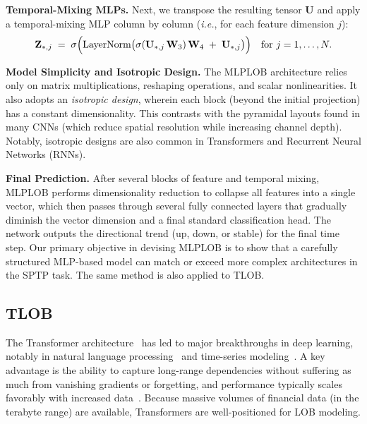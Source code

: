 \textbf{Temporal-Mixing MLPs.}
Next, we transpose the resulting tensor $\mathbf{U}$ and apply a temporal-mixing MLP column by column (\emph{i.e.}, for each feature dimension $j$):
\begin{equation}
    \mathbf{Z}_{*,j} \;=\; 
    \sigma\Bigl(
      \text{LayerNorm}\bigl(
          \sigma(\mathbf{U}_{*,j}\,\mathbf{W}_3)\,\mathbf{W}_4 
          \;+\; \mathbf{U}_{*,j}
      \bigr)
    \Bigr)
    \quad\text{for } j=1,\dots,N.
\end{equation}



\textbf{Model Simplicity and Isotropic Design.}
The MLPLOB architecture relies only on matrix multiplications, reshaping operations, and scalar nonlinearities. It also adopts an \emph{isotropic design}, wherein each block (beyond the initial projection) has a constant dimensionality. This contrasts with the pyramidal layouts found in many CNNs (which reduce spatial resolution while increasing channel depth). Notably, isotropic designs are also common in Transformers and Recurrent Neural Networks (RNNs).

\textbf{Final Prediction.}
After several blocks of feature and temporal mixing, MLPLOB performs dimensionality reduction to collapse all features into a single vector, which then passes through several fully connected layers that gradually diminish the vector dimension and a final standard classification head. The network outputs the directional trend (up, down, or stable) for the final time step. Our primary objective in devising MLPLOB is to show that a carefully structured MLP-based model can match or exceed more complex architectures in the SPTP task. The same method is also applied to TLOB. 



\subsection{TLOB}

The Transformer architecture~\cite{vaswani2017attention} has led to major breakthroughs in deep learning, notably in natural language processing~\cite{brown2020language, khan2022transformers} and time-series modeling~\cite{wen2022transformers}. A key advantage is the ability to capture long-range dependencies without suffering as much from vanishing gradients or forgetting, and performance typically scales favorably with increased data~\cite{kaplan2020scaling}. Because massive volumes of financial data (in the terabyte range) are available, Transformers are well-positioned for LOB modeling.

